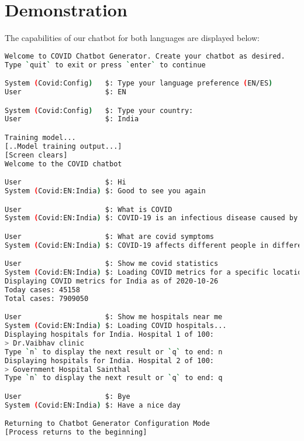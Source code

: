\documentclass[]{article}
\begin{document}
\section{Demonstration}
The capabilities of our chatbot for both languages are displayed below:

\begin{lstlisting}[language=bash, caption=English Chatbot Test Case, style=mybashcode]
Welcome to COVID Chatbot Generator. Create your chatbot as desired.
Type `quit` to exit or press `enter` to continue

System (Covid:Config)   $: Type your language preference (EN/ES)
User                    $: EN

System (Covid:Config)   $: Type your country:
User                    $: India

Training model...
[..Model training output...]
[Screen clears]
Welcome to the COVID chatbot

User                    $: Hi
System (Covid:EN:India) $: Good to see you again

User                    $: What is COVID
System (Covid:EN:India) $: COVID-19 is an infectious disease caused by severte acute respiratory syndome coronaravirus 2

User                    $: What are covid symptoms
System (Covid:EN:India) $: COVID-19 affects different people in different ways. Infected people have had a wide range of symptoms reported  from mild symptoms to severe illness.

User                    $: Show me covid statistics
System (Covid:EN:India) $: Loading COVID metrics for a specific location...
Displaying COVID metrics for India as of 2020-10-26
Today cases: 45158
Total cases: 7909050

User                    $: Show me hospitals near me
System (Covid:EN:India) $: Loading COVID hospitals...
Displaying hospitals for India. Hospital 1 of 100:
> Dr.Vaibhav clinic
Type `n` to display the next result or `q` to end: n
Displaying hospitals for India. Hospital 2 of 100:
> Government Hospital Sainthal
Type `n` to display the next result or `q` to end: q

User                    $: Bye
System (Covid:EN:India) $: Have a nice day

Returning to Chatbot Generator Configuration Mode
[Process returns to the beginning]

\end{lstlisting}
\end{document}
